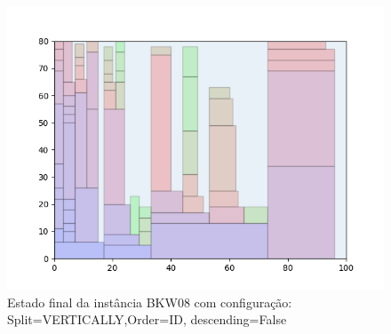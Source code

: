 \begin{figure}[H]
    \centering
    \caption[]{Estado final da instância BKW08 com configuração: Split=VERTICALLY,Order=ID, descending=False}
    \label{fig:bkw08-vertically-id-false}
    \includegraphics[scale=0.5]{output/figures/bkw/bkw08/vertically/id/false/00}
\end{figure}